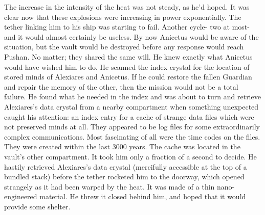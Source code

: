 \documentclass[a4paper]{article}
\begin{document}
The increase in the intensity of the heat was not steady, as he’d hoped. It was clear now that these explosions were increasing in power exponentially. The tether linking him to his ship was starting to fail. Another cycle- two at most- and it would almost certainly be useless.
By now Anicetus would be aware of the situation, but the vault would be destroyed before any response would reach Pushan. No matter; they shared the same will. He knew exactly what Anicetus would have wished him to do. He scanned the index crystal for the location of stored minds of Alexiares and Anicetus. If he could restore the fallen Guardian and repair the memory of the other, then the mission would not be a total failure.
He found what he needed in the index and was about to turn and retrieve Alexiares’s data crystal from a nearby compartment when something unexpected caught his attention: an index entry for a cache of strange data files which were not preserved minds at all. They appeared to be log files for some extraordinarily complex communications. Most fascinating of all were the time codes on the files. They were created within the last 3000 years.
The cache was located in the vault’s other compartment. It took him only a fraction of a second to decide. He hastily retrieved Alexiares’s data crystal (mercifully accessible at the top of a bundled stack) before the tether rocketed him to the doorway, which opened strangely as it had been warped by the heat. It was made of a thin nano-engineered material. He threw it closed behind him, and hoped that it would provide some shelter.
\end{document}
